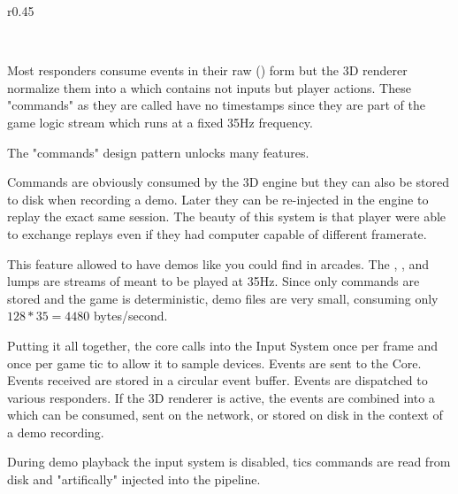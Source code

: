 \begin{wrapfigure}[12]{r}{0.45\textwidth}
\centering
{}
\end{wrapfigure}
\\
\par
Most responders consume events in their raw () form but the 3D renderer normalize them into a  which contains not inputs but player actions. These "commands" as they are called have no timestamps since they are part of the game logic stream which runs at a fixed 35Hz frequency. \\
\par
{} \label{cmd_t_type}
\par
The "commands" design pattern unlocks many features. \\
\par
Commands are obviously consumed by the 3D engine but they can also be stored to disk when recording a demo. Later they can be re-injected in the engine to replay the exact same session. The beauty of this system is that player were able to exchange replays even if they had computer capable of different framerate.\\
\par
This feature allowed \doom{} to have demos like you could find in arcades. The , , and  lumps are streams of  meant to be played at 35Hz. Since only commands are stored and the game is deterministic, demo files are very small, consuming only $ 128 * 35 = 4480 $ bytes/second.\\

\par
Putting it all together,  the core calls into the Input System once per frame and once per game tic to allow it to sample devices.  Events are sent to the Core.  Events received are stored in a circular event buffer.  Events are dispatched to various responders. If the 3D renderer is active, the events are combined into a  which can be consumed, sent on the network, or stored on disk in the context of a demo recording.\\
\par
 During demo playback the input system is disabled, tics commands are read from disk and "artifically" injected into the pipeline.
